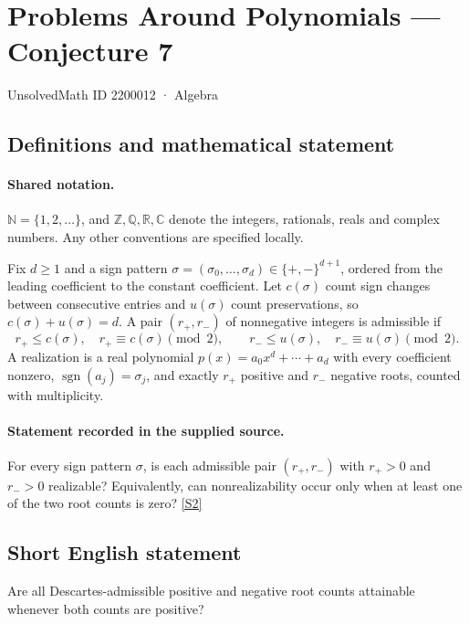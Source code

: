 \documentclass[11pt]{article}
\newcommand{\sref}[2]{\hyperlink{source:#1:#2}{[S#2]}}
\begin{document}
\setcounter{section}{2200011}
\section{Problems Around Polynomials — Conjecture 7}\label{2200012}
{\small\sffamily UnsolvedMath ID 2200012 · Algebra}
\subsection{Definitions and mathematical statement}

\paragraph{Shared notation.}$\mathbb N=\{1,2,\ldots\}$, and $\mathbb Z,\mathbb Q,\mathbb R,\mathbb C$ denote the integers, rationals, reals and complex numbers. Any other conventions are specified locally.


Fix $d\geq1$ and a sign pattern $\sigma=(\sigma_0,\ldots,\sigma_d)\in\{+,-\}^{d+1}$, ordered from the leading coefficient to the constant coefficient. Let $c(\sigma)$ count sign changes between consecutive entries and $u(\sigma)$ count preservations, so $c(\sigma)+u(\sigma)=d$. A pair $(r_+,r_-)$ of nonnegative integers is admissible if
\[r_+\leq c(\sigma),\quad r_+\equiv c(\sigma)\pmod2,\qquad r_-\leq u(\sigma),\quad r_-\equiv u(\sigma)\pmod2.\]
A realization is a real polynomial $p(x)=a_0x^d+\cdots+a_d$ with every coefficient nonzero, $\operatorname{sgn}(a_j)=\sigma_j$, and exactly $r_+$ positive and $r_-$ negative roots, counted with multiplicity.
\paragraph{Statement recorded in the supplied source.}
For every sign pattern $\sigma$, is each admissible pair $(r_+,r_-)$ with $r_+>0$ and $r_->0$ realizable? Equivalently, can nonrealizability occur only when at least one of the two root counts is zero? \sref{2200012}{2}
\subsection{Short English statement}
Are all Descartes-admissible positive and negative root counts attainable whenever both counts are positive?
\end{document}
